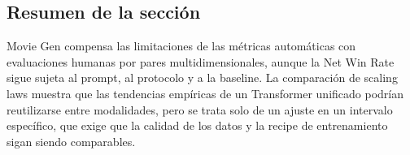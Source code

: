 \subsection{Resumen de la sección}

Movie Gen compensa las limitaciones de las métricas automáticas con evaluaciones humanas por pares multidimensionales, aunque la Net Win Rate sigue sujeta al prompt, al protocolo y a la baseline. La comparación de scaling laws muestra que las tendencias empíricas de un Transformer unificado podrían reutilizarse entre modalidades, pero se trata solo de un ajuste en un intervalo específico, que exige que la calidad de los datos y la recipe de entrenamiento sigan siendo comparables.

